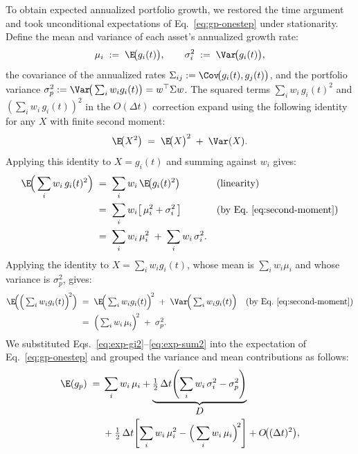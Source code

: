 To obtain expected annualized portfolio growth, we restored the time
argument and took unconditional expectations of
Eq.~\eqref{eq:gp-onestep} under stationarity. Define the mean and
variance of each asset's annualized growth rate:
\begin{equation}
  \mu_i \;:=\; \E\!\big(g_i(t)\big), \qquad
  \sigma_i^2 \;:=\; \Var\!\big(g_i(t)\big),
\end{equation}
the covariance of the annualized rates
$\Sigma_{ij} := \Cov\!\big(g_i(t), g_j(t)\big)$, and the portfolio
variance
$\sigma_p^2 := \Var\!\big(\textstyle\sum_i w_i g_i(t)\big) =
w^\top \Sigma w$. The squared terms $\sum_i w_i\, g_i(t)^2$ and $(\sum_i w_i\, g_i(t))^2$ in the $O(\Delta t)$ correction expand using the following identity for any $X$ with finite second moment:
\begin{equation}
  \E\!\big(X^2\big) \;=\; \E\!\big(X\big)^2 \;+\; \Var(X).
  \label{eq:second-moment}
\end{equation}
Applying this identity to $X = g_i(t)$ and summing against $w_i$ gives:
\begin{align}
  \E\!\Big(\sum_{i} w_i\, g_i(t)^2\Big)
   &\;=\; \sum_{i} w_i\, \E\!\big(g_i(t)^2\big)
       && \text{(linearity)} \notag \\
   &\;=\; \sum_{i} w_i\!\left[\,\mu_i^2 + \sigma_i^2\,\right]
       && \text{(by Eq.~\eqref{eq:second-moment})} \notag \\
   &\;=\; \sum_{i} w_i\, \mu_i^2 \;+\; \sum_{i} w_i\, \sigma_i^2.
   \label{eq:exp-gi2}
\end{align}
Applying the identity to $X = \sum_i w_i g_i(t)$, whose mean is
$\sum_i w_i\mu_i$ and whose variance is $\sigma_p^2$, gives:
\begin{align}
  \E\!\Big(\Big(\textstyle\sum_{i} w_i g_i(t)\Big)^{\!2}\Big)
   &\;=\; \E\!\Big(\textstyle\sum_{i} w_i g_i(t)\Big)^{\!2}
       \;+\; \Var\!\Big(\textstyle\sum_{i} w_i g_i(t)\Big)
       && \text{(by Eq.~\eqref{eq:second-moment})} \notag \\
   &\;=\; \Big(\textstyle\sum_{i} w_i\, \mu_i\Big)^{\!2}
       \;+\; \sigma_p^2.
   \label{eq:exp-sum2}
\end{align}
We substituted Eqs.~\eqref{eq:exp-gi2}--\eqref{eq:exp-sum2} into the
expectation of Eq.~\eqref{eq:gp-onestep} and grouped the variance and
mean contributions as follows:
\begin{equation}
\begin{aligned}
  \E(g_p) \;={}& \sum_{i} w_i\, \mu_i
  + \underbrace{\tfrac{1}{2}\,\Delta t\!\left(\sum_{i} w_i\, \sigma_i^2
       - \sigma_p^2\right)}_{\displaystyle D} \\
  &+ \tfrac{1}{2}\,\Delta t\!\left[\sum_{i} w_i\, \mu_i^2
       - \Big(\sum_{i} w_i\, \mu_i\Big)^{\!2}\right]
  + O\!\big((\Delta t)^2\big),
\end{aligned}
  \label{eq:booth-fama}
\end{equation}
